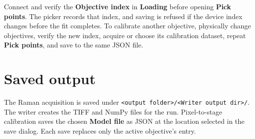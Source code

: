 \documentclass[11pt,oneside]{report}
\newcommand{\ui}[1]{\textbf{#1}}
\newcommand{\code}[1]{\texttt{#1}}
\begin{document}
Connect and verify the \ui{Objective index} in \ui{Loading} before opening
\ui{Pick points}. The picker records that index, and saving is refused if the
device index changes before the fit completes. To calibrate another objective,
physically change objectives, verify the new index, acquire or choose its
calibration dataset, repeat \ui{Pick points}, and save to the same JSON file.

\section*{Saved output}
The Raman acquisition is saved under
\code{<output folder>/<Writer output dir>/}. The writer creates the TIFF and NumPy
files for the run. Pixel-to-stage calibration saves the chosen \ui{Model file} as
JSON at the location selected in the save dialog. Each save replaces only the active
objective's entry.
\end{document}
